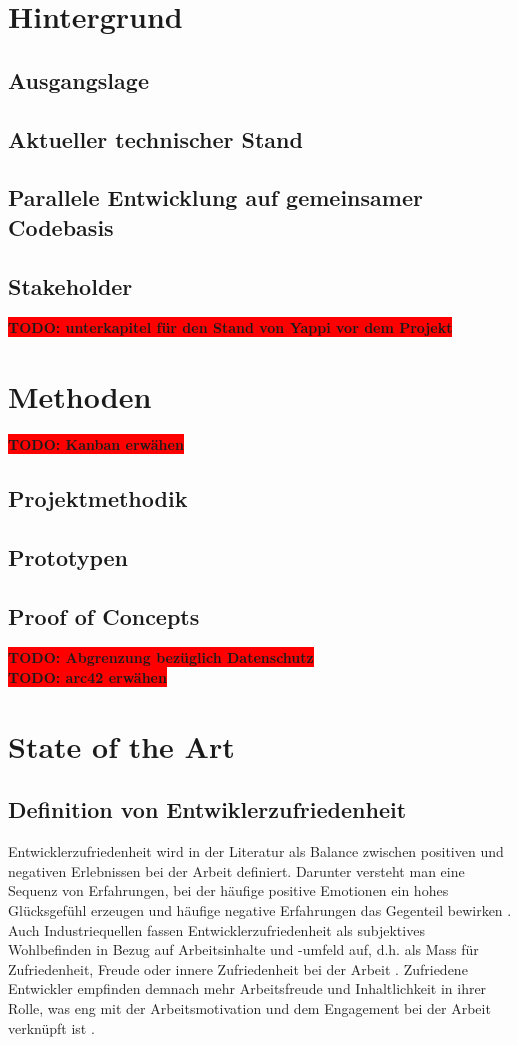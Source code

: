 \documentclass[12pt,a4paper]{report}
\newcommand{\todo}[1]{\colorbox{red}{\textbf{TODO: #1}}\\}
\begin{document}
\chapter{Hintergrund}
\section{Ausgangslage}
\section{Aktueller technischer Stand}
\section{Parallele Entwicklung auf gemeinsamer Codebasis}
\section{Stakeholder}
\todo{unterkapitel für den Stand von Yappi vor dem Projekt}

\chapter{Methoden}
\todo{Kanban erwähen}
\section{Projektmethodik}
\section{Prototypen}
\section{Proof of Concepts}
\todo{Abgrenzung bezüglich Datenschutz}
\todo{arc42 erwähen}

\chapter{State of the Art}
\section{Definition von Entwiklerzufriedenheit}

Entwicklerzufriedenheit wird in der Literatur als Balance zwischen positiven und negativen Erlebnissen bei der
Arbeit definiert. Darunter versteht man eine Sequenz von Erfahrungen, bei der häufige positive Emotionen ein
hohes Glücksgefühl erzeugen und häufige negative Erfahrungen das Gegenteil bewirken \cite{sadowski_happiness_2019}.
Auch Industriequellen fassen Entwicklerzufriedenheit als subjektives Wohlbefinden in Bezug auf Arbeitsinhalte
und -umfeld auf, d.h. als Mass für Zufriedenheit, Freude oder innere Zufriedenheit bei der Arbeit \cite{zenhub_2022_nodate}.
Zufriedene Entwickler empfinden demnach mehr Arbeitsfreude und Inhaltlichkeit in ihrer Rolle, was eng mit
der Arbeitsmotivation und dem Engagement bei der Arbeit verknüpft ist \cite{franca_motivation_2020}.
\end{document}
